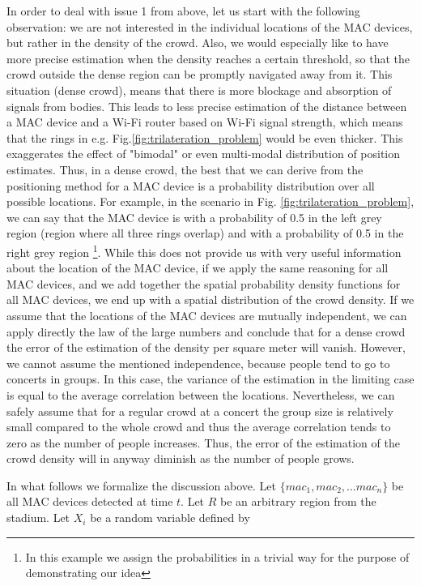 \documentclass[10pt,a4paper]{article}
\begin{document}
In order to deal with issue 1 from above, let us start with the following observation: we are not interested in the individual locations of the MAC devices, but rather in the density of the crowd. Also, we would  especially like to have more precise estimation when the density reaches a certain threshold, so that the crowd outside the dense region can be promptly navigated away from it. 
This situation (dense crowd), means that there is more blockage and absorption of signals from bodies. This leads to less precise estimation of the distance between a MAC device and a Wi-Fi router based on Wi-Fi signal strength, which means that the rings in e.g.  Fig.\ref{fig:trilateration_problem} would be even thicker. This exaggerates the effect of "bimodal" or even multi-modal distribution of position estimates. Thus, in a dense crowd, the best that we can derive from the positioning method for a MAC device is a probability distribution over all possible locations. For example, in the scenario in Fig. \ref{fig:trilateration_problem}, we can say that the MAC device is with a probability of 0.5 in the left grey region (region where all three rings overlap) and with a probability of 0.5 in the right grey region \footnote{In this example we assign the probabilities in a trivial way for the purpose of demonstrating our idea}. While this does not provide us with  very useful information about the location of the MAC device, if we apply the same reasoning for all MAC devices, and we add together the spatial probability density functions for all MAC devices, we end up with a spatial distribution of the crowd density. If we assume that the locations of the MAC devices are mutually independent, we can  apply directly the law of the large numbers and conclude that for a dense crowd the error of the estimation of the density per square meter will vanish. However, we cannot assume the mentioned independence, because people tend to go to concerts in groups. In this case, the variance of the estimation in the limiting case is equal to the average correlation between the locations. Nevertheless, we can safely assume that for a regular crowd at a concert the group size is relatively small compared to the whole crowd and thus the average correlation tends to zero as the number of people increases. Thus, the error of the estimation of the crowd density will in anyway diminish as the number of people grows. 

In what follows we formalize the discussion above. 
Let $\{mac_1, mac_2,...mac_n\}$ be all MAC devices detected at time $t$. Let $R$ be an arbitrary region from the stadium.  Let $X_i$ be a random variable defined by
\end{document}
